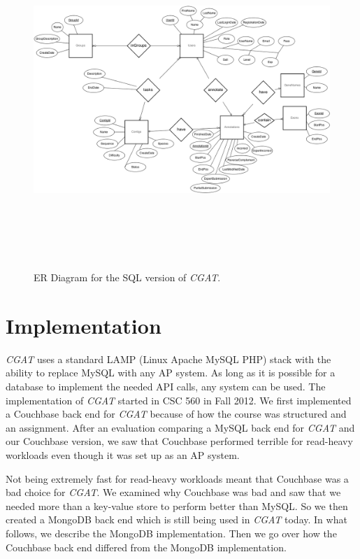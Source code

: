 \documentclass[12pt]{ucthesis}
\newcommand{\captionfonts}{\small\bf\ssp}
\begin{document}
\begin{figure}[H]
\begin{center}
\includegraphics[height=120mm,angle=90]{er-diagram.png}
\captionfonts
\caption[ER Diagram of \textit{CGAT}]{ER Diagram for the SQL version of \textit{CGAT}.}
\label{fig:sql-diagram}
\end{center}
\end{figure}

\section{Implementation}
\label{cgat-implementation}
\textit{CGAT} uses a standard LAMP (Linux Apache MySQL PHP) stack with the ability to replace MySQL with any AP system. As long as it is possible for a database to implement the needed API calls, any system
can be used. The implementation of \textit{CGAT} started in CSC 560 in Fall 2012. We first implemented
a Couchbase back end for \textit{CGAT} because of how the course was structured and an assignment. After
an evaluation comparing a MySQL back end for \textit{CGAT} and our Couchbase version, we saw that Couchbase
performed terrible for read-heavy workloads even though it was set up as an AP system.

Not being extremely fast for read-heavy workloads meant that Couchbase was a bad choice for \textit{CGAT}.
We examined why Couchbase was bad and saw that we needed more than a key-value store to perform better than
MySQL. So we then created a MongoDB back end which is still being used in
\textit{CGAT} today. In what follows, we describe the MongoDB implementation. Then we go over how the Couchbase
back end differed from the MongoDB implementation.
\end{document}
